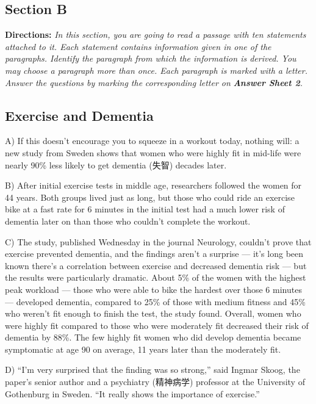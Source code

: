 \documentclass[UTF8,11pt]{ctexart}
\begin{document}
\subsection*{\textbf{Section B}}


\textbf{Directions:} \textit{In this section, you are going to read a passage with ten statements attached to it. Each statement contains} \textit{information given in one of the paragraphs. Identify the paragraph from which the information is derived. You may} \textit{choose a paragraph more than once. Each paragraph is marked with a letter. Answer the questions by marking the} \textit{corresponding letter on }\textbf{\textit{Answer Sheet 2}}\textit{.}


\subsection*{\textbf{Exercise and Dementia}}


A) If this doesn’t encourage you to squeeze in a workout today, nothing will: a new study from Sweden shows that women who were highly fit in mid-life were nearly 90\% less likely to get dementia (失智) decades later.


B) After initial exercise tests in middle age, researchers followed the women for 44 years. Both groups lived just as long, but those who could ride an exercise bike at a fast rate for 6 minutes in the initial test had a much lower risk of dementia later on than those who couldn’t complete the workout.


C) The study, published Wednesday in the journal Neurology, couldn’t prove that exercise prevented dementia, and the findings aren’t a surprise — it’s long been known there’s a correlation between exercise and decreased dementia risk — but the results were particularly dramatic. About 5\% of the women with the highest peak workload — those who were able to bike the hardest over those 6 minutes — developed dementia, compared to 25\% of those with medium fitness and 45\% who weren’t fit enough to finish the test, the study found. Overall, women who were highly fit compared to those who were moderately fit decreased their risk of dementia by 88\%. The few highly fit women who did develop dementia became symptomatic at age 90 on average, 11 years later than the moderately fit.


D) “I’m very surprised that the finding was so strong,” said Ingmar Skoog, the paper’s senior author and a psychiatry (精神病学) professor at the University of Gothenburg in Sweden. “It really shows the importance of exercise.”
\end{document}
